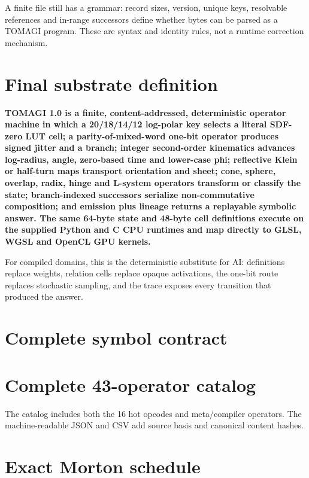 \documentclass[11pt,a4paper]{article}
\begin{document}
A finite file still has a grammar: record sizes, version, unique keys, resolvable references and in-range successors define whether bytes can be parsed as a TOMAGI program. These are syntax and identity rules, not a runtime correction mechanism.

\section{Final substrate definition}

\begin{definitionbox}
\textbf{TOMAGI 1.0 is a finite, content-addressed, deterministic operator machine in which a 20/18/14/12 log-polar key selects a literal SDF-zero LUT cell; a parity-of-mixed-word one-bit operator produces signed jitter and a branch; integer second-order kinematics advances log-radius, angle, zero-based time and lower-case phi; reflective Klein or half-turn maps transport orientation and sheet; cone, sphere, overlap, radix, hinge and L-system operators transform or classify the state; branch-indexed successors serialize non-commutative composition; and emission plus lineage returns a replayable symbolic answer. The same 64-byte state and 48-byte cell definitions execute on the supplied Python and C CPU runtimes and map directly to GLSL, WGSL and OpenCL GPU kernels.}
\end{definitionbox}

For compiled domains, this is the deterministic substitute for AI: definitions replace weights, relation cells replace opaque activations, the one-bit route replaces stochastic sampling, and the trace exposes every transition that produced the answer.

\clearpage
\appendix
\section{Complete symbol contract}


\clearpage
\section{Complete 43-operator catalog}
The catalog includes both the 16 hot opcodes and meta/compiler operators. The machine-readable JSON and CSV add source basis and canonical content hashes.


\clearpage
\section{Exact Morton schedule}

\end{document}
